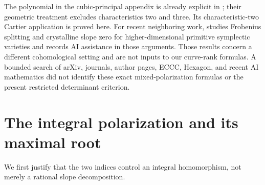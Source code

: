\documentclass[11pt]{article}
\theoremstyle{definition}\newtheorem{definition}[theorem]{Definition}
\theoremstyle{remark}\newtheorem{remark}[theorem]{Remark}
\begin{document}
The polynomial in the cubic-principal appendix is already explicit in \citet[equation~(3.9), author version p.~14]{GrusonSam}; their geometric treatment excludes characteristics two and three. Its characteristic-two Cartier application is proved here. For recent neighboring work, \citet[\S1.3 and acknowledgements]{Zou} studies Frobenius splitting and crystalline slope zero for higher-dimensional primitive symplectic varieties and records AI assistance in those arguments. Those results concern a different cohomological setting and are not inputs to our curve-rank formulas. A bounded search of arXiv, journals, author pages, ECCC, Hexagon, and recent AI mathematics did not identify these exact mixed-polarization formulas or the present restricted determinant criterion.

\section{The integral polarization and its maximal root}

We first justify that the two indices control an integral homomorphism, not merely a rational slope decomposition.
\end{document}
